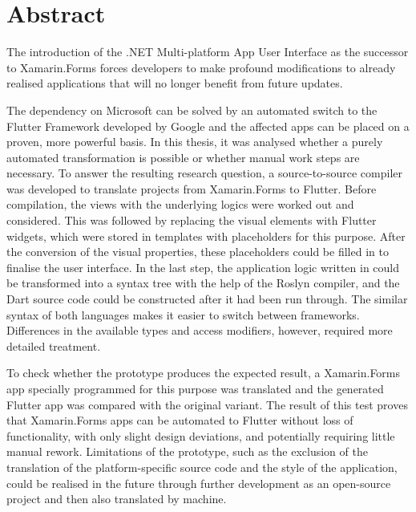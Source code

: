 \chapter*{Abstract}

The introduction of the .NET Multi-platform App User Interface as the successor to Xamarin.Forms forces developers to make profound modifications to already realised applications that will no longer benefit from future updates.

The dependency on Microsoft can be solved by an automated switch to the Flutter Framework developed by Google and the affected apps can be placed on a proven, more powerful basis. In this thesis, it was analysed whether a purely automated transformation is possible or whether manual work steps are necessary.  To answer the resulting research question, a source-to-source compiler was developed to translate projects from Xamarin.Forms to Flutter. Before compilation, the views with the underlying logics were worked out and considered.  This was followed by replacing the visual elements with Flutter widgets, which were stored in templates with placeholders for this purpose. After the conversion of the visual properties, these placeholders could be filled in to finalise the user interface.  In the last step, the application logic written in \Csharp{} could be transformed into a syntax tree with the help of the Roslyn compiler, and the Dart source code could be constructed after it had been run through. The similar syntax of both languages makes it easier to switch between frameworks.  Differences in the available types and access modifiers, however, required more detailed treatment.

To check whether the prototype produces the expected result, a Xamarin.Forms app specially programmed for this purpose was translated and the generated Flutter app was compared with the original variant. The result of this test proves that Xamarin.Forms apps can be automated to Flutter without loss of functionality, with only slight design deviations, and potentially requiring little manual rework.  Limitations of the prototype, such as the exclusion of the translation of the platform-specific source code and the style of the application, could be realised in the future through further development as an open-source project and then also translated by machine.

